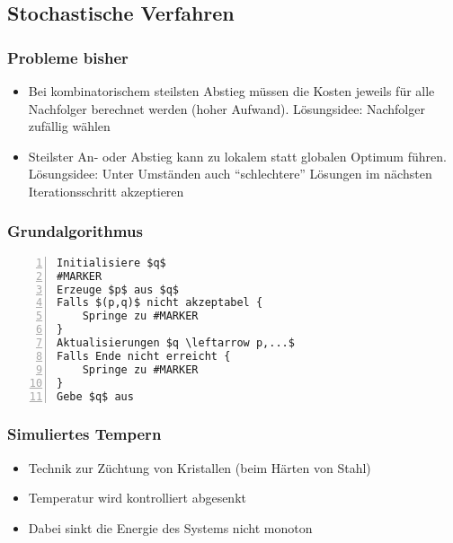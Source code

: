 \subsection{Stochastische Verfahren}

\subsubsection{Probleme bisher}
\begin{itemize}
	\item Bei kombinatorischem steilsten Abstieg müssen die Kosten jeweils für alle Nachfolger berechnet werden (hoher Aufwand). Lösungsidee: Nachfolger zufällig wählen
	\item Steilster An- oder Abstieg kann zu lokalem statt globalen Optimum führen. Lösungsidee: Unter Umständen auch "`schlechtere"' Lösungen im nächsten Iterationsschritt akzeptieren
\end{itemize}

\subsubsection{Grundalgorithmus}
\begin{minipage}{\textwidth}
\begin{lstlisting}[frame=single,numbers=left,mathescape]
Initialisiere $q$
#MARKER
Erzeuge $p$ aus $q$
Falls $(p,q)$ nicht akzeptabel {
	Springe zu #MARKER
}
Aktualisierungen $q \leftarrow p,...$
Falls Ende nicht erreicht {
	Springe zu #MARKER
}
Gebe $q$ aus
\end{lstlisting}
\end{minipage}

\subsubsection{Simuliertes Tempern}
\begin{itemize}
	\item Technik zur Züchtung von Kristallen (beim Härten von Stahl)
	\item Temperatur wird kontrolliert abgesenkt
	\item Dabei sinkt die Energie des Systems nicht monoton
\end{itemize}

